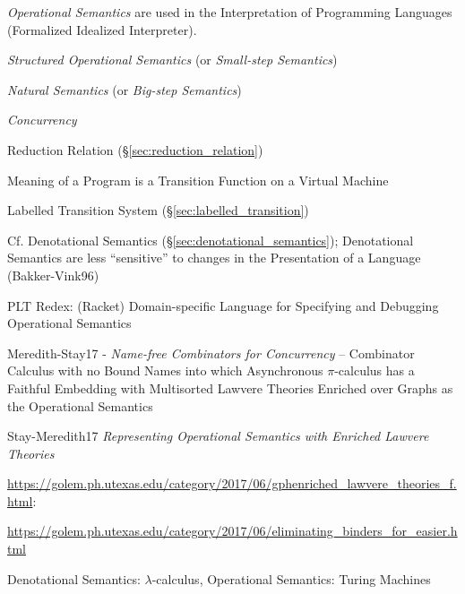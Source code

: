 \emph{Operational Semantics} are used in the Interpretation of
Programming Languages (Formalized Idealized Interpreter).

\emph{Structured Operational Semantics} (or \emph{Small-step Semantics})

\emph{Natural Semantics} (or \emph{Big-step Semantics})

\emph{Concurrency}

Reduction Relation (\S\ref{sec:reduction_relation})

Meaning of a Program is a Transition Function on a Virtual Machine

Labelled Transition System (\S\ref{sec:labelled_transition})

\fist Cf. Denotational Semantics (\S\ref{sec:denotational_semantics});
Denotational Semantics are less ``sensitive'' to changes in the
Presentation of a Language (Bakker-Vink96) %

PLT Redex: (Racket) Domain-specific Language for Specifying and
Debugging Operational Semantics

Meredith-Stay17 - \emph{Name-free Combinators for Concurrency} --
Combinator Calculus with no Bound Names into which Asynchronous
$\pi$-calculus has a Faithful Embedding with Multisorted Lawvere
Theories Enriched over Graphs as the Operational Semantics

Stay-Meredith17 \emph{Representing Operational Semantics with Enriched
Lawvere Theories}

\url{https://golem.ph.utexas.edu/category/2017/06/gphenriched_lawvere_theories_f.html}:

\url{https://golem.ph.utexas.edu/category/2017/06/eliminating_binders_for_easier.html}

Denotational Semantics: $\lambda$-calculus, Operational Semantics:
Turing Machines

